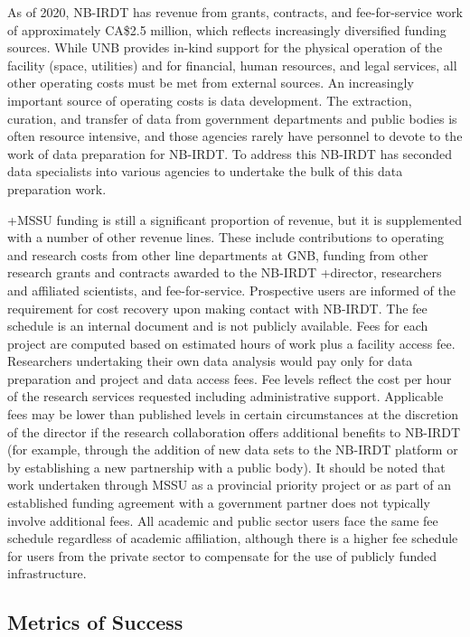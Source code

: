 \documentclass[
]{book}
\begin{document}
As of 2020, NB-IRDT has revenue from grants, contracts, and fee-for-service work of approximately CA\$2.5 million, which reflects increasingly diversified funding sources. While UNB provides in-kind support for the physical operation of the facility (space, utilities) and for financial, human resources, and legal services, all other operating costs must be met from external sources. An increasingly important source of operating costs is data development. The extraction, curation, and transfer of data from government departments and public bodies is often resource intensive, and those agencies rarely have personnel to devote to the work of data preparation for NB-IRDT. To address this NB-IRDT has seconded data specialists into various agencies to undertake the bulk of this data preparation work.

+MSSU\textbar{} funding is still a significant proportion of revenue, but it is supplemented with a number of other revenue lines. These include contributions to operating and research costs from other line departments at GNB, funding from other research grants and contracts awarded to the NB-IRDT +director\textbar, researchers and affiliated scientists, and fee-for-service. Prospective users are informed of the requirement for cost recovery upon making contact with NB-IRDT. The fee schedule is an internal document and is not publicly available. Fees for each project are computed based on estimated hours of work plus a facility access fee. Researchers undertaking their own data analysis would pay only for data preparation and project and data access fees. Fee levels reflect the cost per hour of the research services requested including administrative support. Applicable fees may be lower than published levels in certain circumstances at the discretion of the director if the research collaboration offers additional benefits to NB-IRDT (for example, through the addition of new data sets to the NB-IRDT platform or by establishing a new partnership with a public body). It should be noted that work undertaken through MSSU as a provincial priority project or as part of an established funding agreement with a government partner does not typically involve additional fees. All academic and public sector users face the same fee schedule regardless of academic affiliation, although there is a higher fee schedule for users from the private sector to compensate for the use of publicly funded infrastructure.

\hypertarget{metrics-of-success-2}{%
\subsection{Metrics of Success}\label{metrics-of-success-2}}
\end{document}
